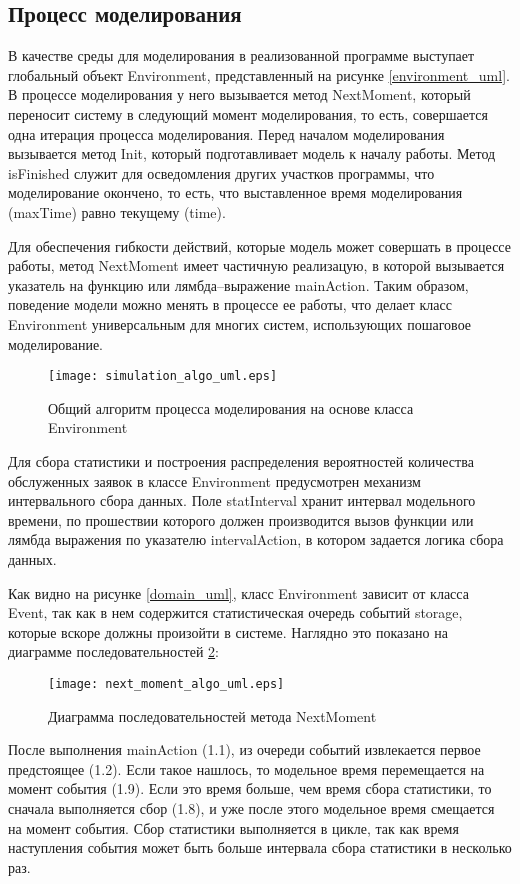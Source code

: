 \subsection{Процесс моделирования}
В качестве среды для моделирования в реализованной программе выступает глобальный объект Environment, представленный на рисунке \ref{environment_uml}. В процессе моделирования у него вызывается метод NextMoment, который переносит систему в следующий момент моделирования, то есть, совершается одна итерация процесса моделирования. Перед началом моделирования вызывается метод Init, который подготавливает модель к началу работы. Метод isFinished служит для осведомления других участков программы, что моделирование окончено, то есть, что выставленное время моделирования (maxTime) равно текущему (time).

Для обеспечения гибкости действий, которые модель может совершать в процессе работы, метод NextMoment имеет частичную реализацую, в которой вызывается указатель на функцию или лямбда--выражение mainAction. Таким образом, поведение модели можно менять в процессе ее работы, что делает класс Environment универсальным для многих систем, использующих пошаговое моделирование.
\begin{figure}[H]
	\centering
	\texttt{[image: simulation\_algo\_uml.eps]}
	\caption{Общий алгоритм процесса моделирования на основе класса Environment}
	\label{simulation_algo_uml}
\end{figure}

Для сбора статистики и построения распределения вероятностей количества обслуженных заявок в классе Environment предусмотрен механизм интервального сбора данных. Поле statInterval хранит интервал модельного времени, по прошествии которого должен производится вызов функции или лямбда выражения по указателю intervalAction, в котором задается логика сбора данных.

Как видно на рисунке \ref{domain_uml}, класс Environment зависит от класса Event, так как в нем содержится статистическая очередь событий storage, которые вскоре должны произойти в системе. Наглядно это показано на диаграмме последовательностей \ref{next_moment_algo_uml}:
\begin{figure}[H]
	\centering
	\texttt{[image: next\_moment\_algo\_uml.eps]}
	\caption{Диаграмма последовательностей метода NextMoment}
	\label{next_moment_algo_uml}
\end{figure}
После выполнения mainAction (1.1), из очереди событий извлекается первое предстоящее (1.2). Если такое нашлось, то модельное время перемещается на момент события (1.9). Если это время больше, чем время сбора статистики, то сначала выполняется сбор (1.8), и уже после этого модельное время смещается на момент события. Сбор статистики выполняется в цикле, так как время наступления события может быть больше интервала сбора статистики в несколько раз.
\clearpage

